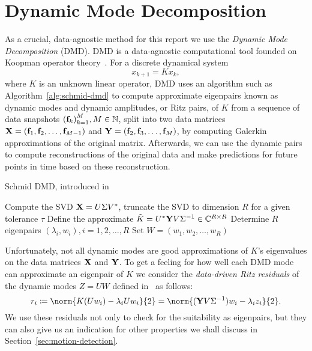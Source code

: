 \section{Dynamic Mode Decomposition}\label{sec:dmd}

As a crucial, data-agnostic method for this report we use the \emph{Dynamic Mode Decomposition} (DMD). DMD is a data-agnostic computational tool founded on Koopman operator theory~\cite{Rowley2009, Williams2015}. For a discrete dynamical system
\begin{equation*}
    x_{k + 1} = K x_k,
\end{equation*}
where $K$ is an unknown linear operator, DMD uses an algorithm such as Algorithm~\ref{alg:schmid-dmd} to compute approximate eigenpairs known as dynamic modes and dynamic amplitudes, or Ritz pairs, of $K$ from a sequence of data snapshots ${(\mathbf{f}_k)}_{k = 1}^M, M \in \mathbb{N}$, split into two data matrices $\mathbf{X} = (\mathbf{f}_1, \mathbf{f}_2, \dots, \mathbf{f}_{M - 1})$ and $\mathbf{Y} = (\mathbf{f}_2, \mathbf{f}_3, \dots, \mathbf{f}_M)$, by computing Galerkin approximations of the original matrix. Afterwards, we can use the dynamic pairs to compute reconstructions of the original data and make predictions for future points in time based on these reconstruction.

\begin{algorithm}[!ht]
    \caption{Schmid DMD, introduced in~\cite{Schmid2010}}\label{alg:schmid-dmd}
    Compute the SVD $\mathbf{X} = U \Sigma V^*$, truncate the SVD to dimension $R$ for a given tolerance $\tau$\;
    Define the approximate $\tilde{K} = U^* \mathbf{Y} V \Sigma^{-1} \in \mathbb{C}^{R \times R}$\;
    Determine $R$ eigenpairs $(\lambda_i, w_i), i = 1, 2, \dots, R$\;
    Set $W = (w_1, w_2, \dots, w_R)$\;
\end{algorithm}

Unfortunately, not all dynamic modes are good approximations of $K$'s eigenvalues on the data matrices $\mathbf{X}$ and $\mathbf{Y}$. To get a feeling for how well each DMD mode can approximate an eigenpair of $K$ we consider the \emph{data-driven Ritz residuals} of the dynamic modes $Z = U W$ defined in~\cite{Drmac2020} as follows:
\begin{equation}\label{eq:residual}
    r_i \coloneqq \norm{K (U w_i) - \lambda_i U w_i}{2} = \norm{(\bl{Y} V \Sigma^{-1}) w_i - \lambda_i z_i}{2}.
\end{equation}
We use these residuals not only to check for the suitability as eigenpairs, but they can also give us an indication for other properties we shall discuss in Section~\ref{sec:motion-detection}.

